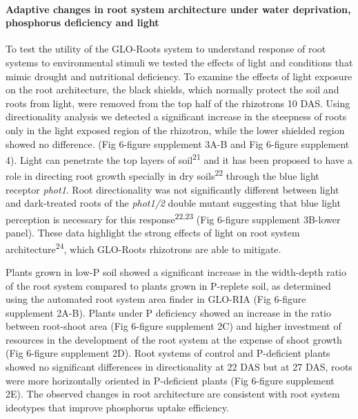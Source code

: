 \documentclass[]{article}
\begin{document}
\paragraph{Adaptive changes in root system architecture under water
deprivation, phosphorus deficiency and
light}\label{adaptive-changes-in-root-system-architecture-under-water-deprivation-phosphorus-deficiency-and-light}

To test the utility of the GLO-Roots system to understand response of
root systems to environmental stimuli we tested the effects of light and
conditions that mimic drought and nutritional deficiency. To examine the
effects of light exposure on the root architecture, the black shields,
which normally protect the soil and roots from light, were removed from
the top half of the rhizotrons 10 DAS. Using directionality analysis we
detected a significant increase in the steepness of roots only in the
light exposed region of the rhizotron, while the lower shielded region
showed no difference. (Fig 6-figure supplement 3A-B and Fig 6-figure
supplement 4). Light can penetrate the top layers of
soil\textsuperscript{21} and it has been proposed to have a role in
directing root growth specially in dry soils\textsuperscript{22} through
the blue light receptor \emph{phot1}. Root directionality was not
significantly different between light and dark-treated roots of the
\emph{phot1/2} double mutant suggesting that blue light perception is
necessary for this response\textsuperscript{22,23} (Fig 6-figure
supplement 3B-lower panel). These data highlight the strong effects of
light on root system architecture\textsuperscript{24}, which GLO-Roots
rhizotrons are able to mitigate.

Plants grown in low-P soil showed a significant increase in the
width-depth ratio of the root system compared to plants grown in
P-replete soil, as determined using the automated root system area
finder in GLO-RIA (Fig 6-figure supplement 2A-B). Plants under P
deficiency showed an increase in the ratio between root-shoot area (Fig
6-figure supplement 2C) and higher investment of resources in the
development of the root system at the expense of shoot growth (Fig
6-figure supplement 2D). Root systems of control and P-deficient plants
showed no significant differences in directionality at 22 DAS but at 27
DAS, roots were more horizontally oriented in P-deficient plants (Fig
6-figure supplement 2E). The observed changes in root architecture are
consistent with root system ideotypes that improve phosphorus uptake
efficiency.
\end{document}
